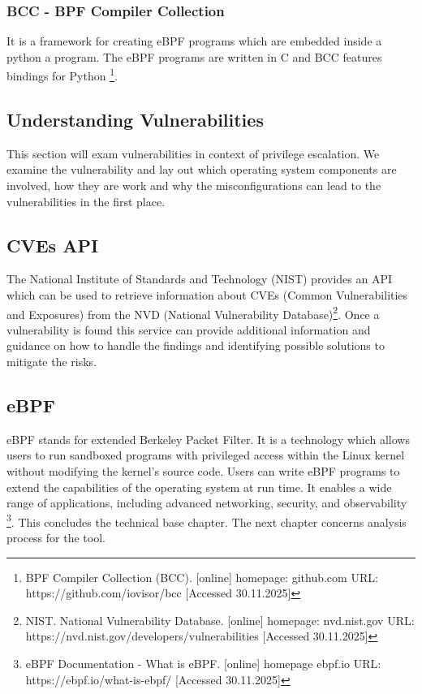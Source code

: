 \subsubsection{BCC - BPF Compiler Collection}

It is a framework for creating eBPF programs which are embedded inside a python a program. The eBPF programs are written in C and BCC features bindings for Python \footnote{BPF Compiler Collection (BCC). [online] homepage: github.com URL: https://github.com/iovisor/bcc [Accessed 30.11.2025]}.


\subsection{Understanding Vulnerabilities}

This section will exam vulnerabilities in context of privilege escalation. We examine the vulnerability and lay out which operating system components are involved, how they are work and why the misconfigurations can lead to the vulnerabilities in the first place. 

\newpage

\subsection{CVEs API}

The National Institute of Standards and Technology (NIST) provides an API which can be used to retrieve information about CVEs (Common Vulnerabilities and Exposures) from the NVD (National Vulnerability Database)\footnote{NIST. National Vulnerability Database. [online] homepage: nvd.nist.gov URL: https://nvd.nist.gov/developers/vulnerabilities [Accessed 30.11.2025]}. Once a vulnerability is found this service can provide additional information and guidance on how to handle the findings and identifying possible solutions to mitigate the risks. 

\subsection{eBPF}

eBPF stands for extended Berkeley Packet Filter. It is a technology which allows users to run sandboxed programs with privileged access within the Linux kernel without modifying the kernel's source code. Users can write eBPF programs to extend the capabilities of the operating system at run time.  It enables a wide range of applications, including advanced networking, security, and observability \footnote{eBPF Documentation - What is eBPF. [online] homepage ebpf.io URL: https://ebpf.io/what-is-ebpf/ [Accessed 30.11.2025]}. \newline\newline This concludes the technical base chapter. The next chapter concerns analysis process for the tool.